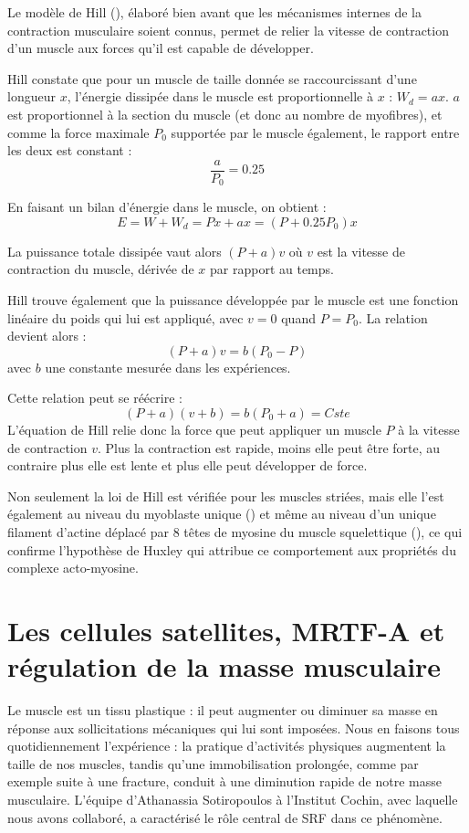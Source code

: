 Le modèle de Hill (\cite{hill_heat_1938}), élaboré bien avant que les mécanismes internes de la contraction musculaire soient connus, permet de relier la vitesse de contraction d'un muscle aux forces qu'il est capable de développer. 

Hill constate que pour un muscle de taille donnée se raccourcissant d'une longueur $x$, l'énergie dissipée dans le muscle est proportionnelle à $x$ : $W_d=ax$. $a$ est proportionnel à la section du muscle (et donc au nombre de myofibres), et comme la force maximale $ P_0$ supportée par le muscle également, le rapport entre les deux  est constant : $$\frac{a}{P_0}=0.25$$

En faisant un bilan d'énergie dans le muscle, on obtient : 
$$ E=W+W_d=Px+ax=(P+0.25P_0)x$$

La puissance totale dissipée vaut alors $(P+a)v$ où $v$ est la vitesse de contraction du muscle, dérivée de $x$ par rapport au temps. 

Hill trouve également que la puissance développée par le muscle est une fonction linéaire du poids qui lui est appliqué, avec $v=0$ quand $P=P_0$. 
La relation devient alors : 
$$ (P+a)v=b(P_0-P)$$
avec $b$ une constante mesurée dans les expériences. 

Cette relation peut se réécrire : 
\begin{equation}
\label{Hill}
(P+a)(v+b)=b(P_0+a)=Cste
\end{equation}
L'équation de Hill relie donc la force que peut appliquer un muscle $P$ à la vitesse de contraction $v$. Plus la contraction est rapide, moins elle peut être forte, au contraire plus elle est lente et plus elle peut développer de force. 

Non seulement la loi de Hill est vérifiée pour les muscles striées, mais elle l'est également au niveau du myoblaste unique (\cite{mitrossilis_single-cell_2009}) et même au niveau d'un unique filament d'actine déplacé par 8 têtes de myosine du muscle squelettique (\cite{debold_slip_2005}), ce qui confirme l'hypothèse de Huxley qui attribue ce comportement aux propriétés du complexe acto-myosine. 

\section{Les cellules satellites, MRTF-A et régulation de la masse musculaire}

Le muscle est un tissu plastique : il peut augmenter ou diminuer sa masse en réponse aux sollicitations mécaniques qui lui sont imposées. Nous en faisons tous quotidiennement l'expérience : la pratique d'activités physiques augmentent la taille de nos muscles, tandis qu'une immobilisation prolongée, comme par exemple suite à une fracture, conduit à une diminution rapide de notre masse musculaire. L'équipe d'Athanassia Sotiropoulos à l'Institut Cochin, avec laquelle nous avons collaboré, a caractérisé le rôle central de SRF dans ce phénomène. 


